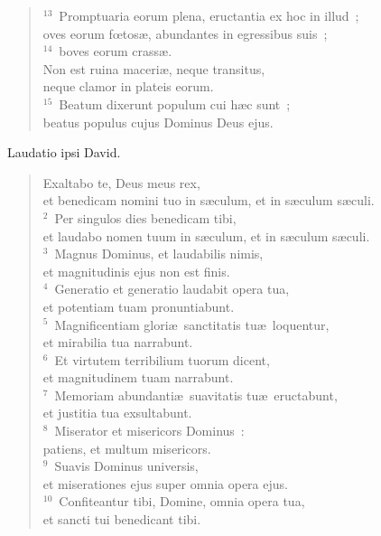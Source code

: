 \begin{flushleft}
\begin{verse}
${}^{13}$~Promptuaria eorum plena, eructantia ex hoc in illud~;\\ oves eorum fœtos\ae , abundantes in egressibus suis~;\\
${}^{14}$~boves eorum crass\ae .\\ Non est ruina maceri\ae , neque transitus,\\ neque clamor in plateis eorum.\\
${}^{15}$~Beatum dixerunt populum cui h\ae c sunt~;\\ beatus populus cujus Dominus Deus ejus.\end{verse}\end{flushleft}



\lettrine[lines=3,image=true,loversize=0.05,lraise=-0.03]{L}{}audatio ipsi David. \begin{flushleft}\begin{verse}\vspace{6pt}Exaltabo te, Deus meus rex,\\ et benedicam nomini tuo in s\ae culum, et in s\ae culum s\ae culi.\\
${}^{2}$~Per singulos dies benedicam tibi,\\ et laudabo nomen tuum in s\ae culum, et in s\ae culum s\ae culi.\\
${}^{3}$~Magnus Dominus, et laudabilis nimis,\\ et magnitudinis ejus non est finis.\\
${}^{4}$~Generatio et generatio laudabit opera tua,\\ et potentiam tuam pronuntiabunt.\\
${}^{5}$~Magnificentiam glori\ae\ sanctitatis tu\ae\ loquentur,\\ et mirabilia tua narrabunt.\\
${}^{6}$~Et virtutem terribilium tuorum dicent,\\ et magnitudinem tuam narrabunt.\\
${}^{7}$~Memoriam abundanti\ae\ suavitatis tu\ae\ eructabunt,\\ et justitia tua exsultabunt.\\
${}^{8}$~Miserator et misericors Dominus~:\\ patiens, et multum misericors.\\
${}^{9}$~Suavis Dominus universis,\\ et miserationes ejus super omnia opera ejus.\\
${}^{10}$~Confiteantur tibi, Domine, omnia opera tua,\\ et sancti tui benedicant tibi.\\

\end{verse}
\end{flushleft}
